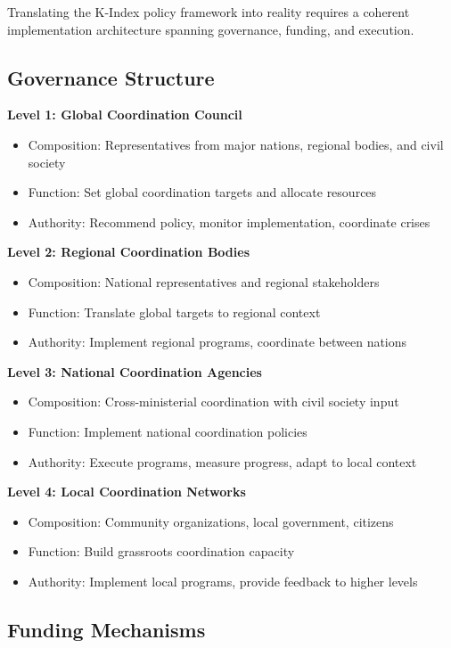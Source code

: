 \documentclass[12pt,letterpaper]{article}
\begin{document}
Translating the K-Index policy framework into reality requires a coherent implementation architecture spanning governance, funding, and execution.

\subsection{Governance Structure}

\textbf{Level 1: Global Coordination Council}
\begin{itemize}
    \item Composition: Representatives from major nations, regional bodies, and civil society
    \item Function: Set global coordination targets and allocate resources
    \item Authority: Recommend policy, monitor implementation, coordinate crises
\end{itemize}

\textbf{Level 2: Regional Coordination Bodies}
\begin{itemize}
    \item Composition: National representatives and regional stakeholders
    \item Function: Translate global targets to regional context
    \item Authority: Implement regional programs, coordinate between nations
\end{itemize}

\textbf{Level 3: National Coordination Agencies}
\begin{itemize}
    \item Composition: Cross-ministerial coordination with civil society input
    \item Function: Implement national coordination policies
    \item Authority: Execute programs, measure progress, adapt to local context
\end{itemize}

\textbf{Level 4: Local Coordination Networks}
\begin{itemize}
    \item Composition: Community organizations, local government, citizens
    \item Function: Build grassroots coordination capacity
    \item Authority: Implement local programs, provide feedback to higher levels
\end{itemize}

\subsection{Funding Mechanisms}
\end{document}
